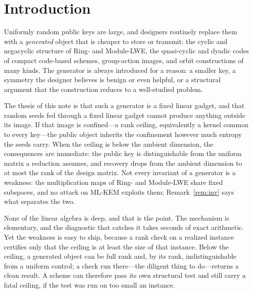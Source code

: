 \documentclass[11pt]{article}
\makeatletter
\theoremstyle{remark}
\DeclareRobustCommand{\_}{%
  \edef\@tempa{\ttdefault}%
  \ifx\f@family\@tempa\char95 \else\textunderscore\fi\penalty300\relax}
\makeatother
\begin{document}
\section{Introduction}\label{sec:intro}

Uniformly random public keys are large, and designers routinely replace them with a \emph{generated} object that is
cheaper to store or transmit: the cyclic and negacyclic structure of Ring- and Module-LWE, the quasi-cyclic and dyadic
codes of compact code-based schemes, group-action images, and orbit constructions of many kinds. The generator is always
introduced for a reason: a smaller key, a symmetry the designer believes is benign or even helpful, or a structural
argument that the construction reduces to a well-studied problem.

The thesis of this note is that such a generator is a fixed linear gadget, and that random seeds fed through a fixed
linear gadget cannot produce anything outside its image. If that image is confined---a rank ceiling, equivalently a
kernel common to every key---the public object inherits the confinement however much entropy the seeds carry. When the
ceiling is below the ambient dimension, the consequences are immediate: the public key is distinguishable from the
uniform matrix a reduction assumes, and recovery drops from the ambient dimension to at most the rank of the design
matrix. Not every invariant of a generator is a weakness: the multiplication maps of Ring- and Module-LWE share fixed
subspaces, and no attack on ML-KEM exploits them; Remark~\ref{rem:inv} says what separates the two.

None of the linear algebra is deep, and that is the point. The mechanism is elementary, and the diagnostic that catches
it takes seconds of exact arithmetic. Yet the weakness is easy to ship, because a rank check on a realized instance
certifies only that the ceiling is at least the size of that instance. Below the ceiling, a generated object can be full
rank and, by its rank, indistinguishable from a uniform control; a check run there---the diligent thing to do---returns a clean
result. A scheme can therefore pass its own structural test and still carry a fatal ceiling, if the test was run on too
small an instance.
\end{document}
